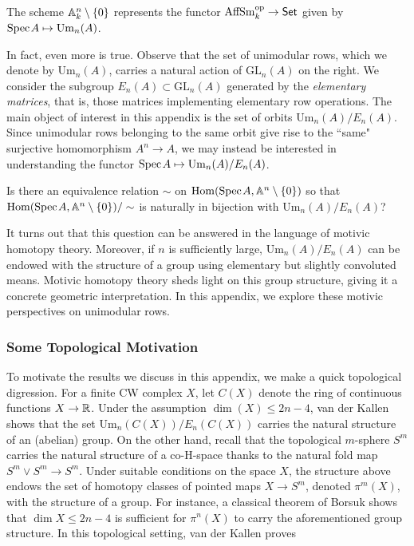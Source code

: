  \begin{proposition}\label{prop:unimodular-basic}
     The scheme $\mathbb{A}^n_k\setminus\{0\}$ represents the  functor $\operatorname{AffSm}^{\mathrm{op}}_k \to \mathsf{Set}$ given by $\text{Spec}\hspace{0.1em} A \mapsto \operatorname{Um}_{n}(A)$. 
 \end{proposition}

In fact, even more is true. Observe that the set of unimodular rows, which we denote by $\mathrm{Um}_n(A)$, carries a natural action of $\mathrm{GL}_n(A)$ on the right. We consider the subgroup $E_n(A) \subset \mathrm{GL}_n(A)$ generated by the \textit{elementary matrices}, that is, those matrices implementing elementary row operations. The main object of interest in this appendix is the set of orbits $\mathrm{Um}_n(A)/E_n(A)$. Since unimodular rows belonging to the same orbit give rise to the ``same" surjective homomorphism $A^n \to A$, we may instead be interested in understanding the functor $\text{Spec}\hspace{0.1em} A \mapsto \mathrm{Um}_n(A)/E_n(A)$. 

\begin{question}\label{question:q1}
    Is there an equivalence relation $\sim$ on $\mathrm{Hom}(\text{Spec}\hspace{0.1em} A,\mathbb{A}^n\setminus\{0\})$ so that $\mathrm{Hom}(\text{Spec}\hspace{0.1em} A,\mathbb{A}^n\setminus\{0\})/\sim$ is naturally in bijection with $\mathrm{Um}_n(A)/E_n(A)$?
\end{question}

It turns out that this question can be answered in the language of motivic homotopy theory. Moreover, if $n$ is sufficiently large, $\mathrm{Um}_n(A)/E_n(A)$ can be endowed with the structure of a group using elementary but slightly convoluted means. Motivic homotopy theory sheds light on this group structure, giving it a concrete geometric interpretation. In this appendix, we explore these motivic perspectives on unimodular rows. 

\subsubsection{Some Topological Motivation}

To motivate the results we discuss in this appendix, we make a quick topological digression. For a finite CW complex $X$, let $C(X)$ denote the ring of continuous functions $X \to \mathbb{R}$. Under the assumption $\dim(X) \leq 2n - 4$, van der Kallen shows that the set $\mathrm{Um}_n(C(X))/E_n(C(X))$ carries the natural structure of an (abelian) group. On the other hand, recall that the topological $m$-sphere $S^m$ carries the natural structure of a co-H-space thanks to the natural fold map $S^m \vee S^m \to S^m$. Under suitable conditions on the space $X$, the structure above endows the set of homotopy classes of pointed maps $X \to S^m$, denoted $\pi^m(X)$, with the structure of a group. For instance, a classical theorem of Borsuk \cite{borsuk} shows that $\dim X \leq 2n - 4$ is sufficient for $\pi^n(X)$ to carry the aforementioned group structure. In this topological setting, van der Kallen \cite[Theorem 7.7]{vdk} proves

